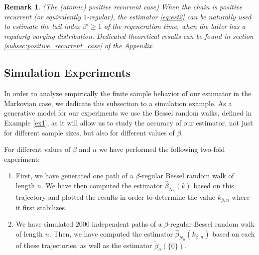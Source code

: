 \documentclass[sn-mathphys-ay]{sn-jnl}%
\newtheorem{remark}{Remark}%
\begin{document}
\begin{remark} {\sc (The (atomic) positive recurrent case)} When the chain is positive recurrent (or equivalently
    $1$-regular), the estimator \eqref{eq:est2} can be naturally used to estimate the tail index $\beta'\geq 1$ of
    the regeneration time, when the latter has a regularly varying distribution. Dedicated theoretical results can be
    found in section \ref{subsec:positive_recurrent_case} of the Appendix.
\end{remark}

\subsection{Simulation Experiments}

In order to analyze empirically the finite sample behavior of our estimator in the Markovian case,
we dedicate this subsection to a simulation example. As a generative model for our experiments we
use the Bessel random walks, defined in Example \ref{ex1}, as it will allow us to study
the accuracy of our estimator, not just for different sample sizes, but also for different
values of \(\beta\).

For different values of \(\beta\) and \(n\) we have performed the following two-fold experiment:
\begin{enumerate}
    \item First, we have generated one path of a $\beta$-regular Bessel random walk of length \(n\). We have then computed the estimator
          \(\widehat{\beta}_{N_{n}}(k)\) based on this trajectory and plotted the results in order to determine
          the value \(k_{\beta,n}\) where it first stabilizes.
    \item We have simulated \(2000\) independent paths of a $\beta$-regular Bessel random walk of length \(n\). Then, we have computed the estimator
          $\widehat{\beta}_{N_{n}}(k_{\beta,n})$ based on each of these trajectories, as well as the estimator
          $\widetilde{\beta}_n(\{0\})$.
\end{enumerate}
\end{document}
